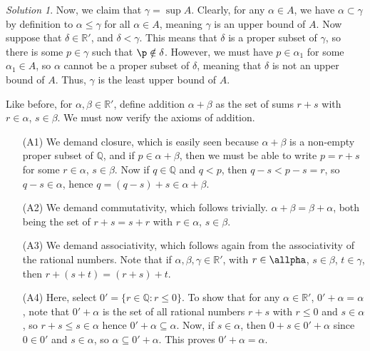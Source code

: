 \documentclass[11pt]{report}
\def\R{\mathbb{R}}
\def\Q{\mathbb{Q}}
\theoremstyle{remark}
\newtheorem*{solution}{Solution}
\begin{document}
\begin{solution}
        Now, we claim that $\gamma = \sup A$. Clearly, for any $\alpha \in A$, we
        have $\alpha \subset \gamma$ by definition to $\alpha \leq \gamma$ for all
        $\alpha \in A$, meaning $\gamma$ is an upper bound of $A$. Now suppose that
        $\delta \in \R'$, and $\delta < \gamma$. This means that $\delta$ is a
        proper subset of $\gamma$, so there is some $p \in \gamma$ such that $\p
        \notin \delta$. However, we must have $p \in \alpha_1$ for some $\alpha_1
        \in A$, so $\alpha$ cannot be a proper subset of $\delta$, meaning that
        $\delta$ is not an upper bound of $A$. Thus, $\gamma$ is the least upper
        bound of $A$.

        Like before, for $\alpha, \beta \in \R'$, define addition $\alpha + \beta$
        as the set of sums $r + s$ with $r \in \alpha$, $s \in \beta$. We must now
        verify the axioms of addition. 
        \begin{itemize}
            \item[(A1)] We demand closure, which is easily seen because $\alpha +
            \beta$ is a non-empty proper subset of $\Q$, and if $p \in \alpha +
            \beta$, then we must be able to write $p = r + s$ for some $r \in
            \alpha$, $s \in \beta$. Now if $q \in \Q$ and $q < p$, then $q - s < p -
            s = r$, so $q - s \in \alpha$, hence $q = (q - s) + s \in \alpha +
            \beta$. 

            \item[(A2)] We demand commutativity, which follows trivially. $\alpha +
            \beta = \beta + \alpha$, both being the set of $r + s = s + r$ with $r
            \in \alpha$, $s \in \beta$. 

            \item[(A3)] We demand associativity, which follows again from the
            associativity of the rational numbers. Note that if $\alpha, \beta,
            \gamma \in \R'$, with $r \in \allpha$, $s \in \beta$, $t \in \gamma$,
            then $r + (s + t) = (r + s) + t$. 

            \item[(A4)] Here, select $0' = \{r \in \Q: r \leq 0\}$. To show that for
            any $\alpha \in \R'$, $0' + \alpha = \alpha$, note that $0' + \alpha$ is
            the set of all rational numbers $r + s$ with $r \leq 0$ and $s \in
            \alpha$, so $r + s \leq s \in \alpha$ hence $0' + \alpha \subseteq
            \alpha$. Now, if $s \in \alpha$, then $0 + s \in 0' + \alpha$ since $0
            \in 0'$ and $s \in \alpha$, so $\alpha \subseteq 0' + \alpha$. This
            proves $0' + \alpha = \alpha$. 


\end{itemize}
\end{solution}
\end{document}
